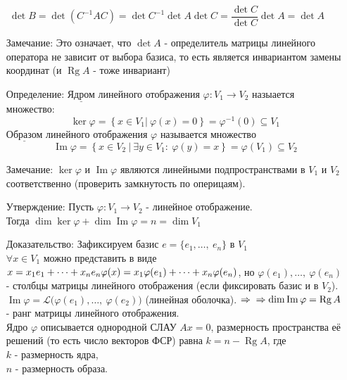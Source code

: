 \documentclass[12pt, letterpaper, twoside]{article}
\newcommand{\Underl}[1]{$\underline{\text{#1}}$}
\newcommand{\Rg}{\operatorname{Rg}}
\begin{document}
            \[\det B = \det \left(C^{-1} A C\right) = \det C^{-1}\det A\det C = \frac{\det C}{\det C}\det A = \det A\]
        \begin{enumerate}
            \item[Замечание:] Это означает, что $\det A$ - определитель матрицы линейного оператора не зависит от выбора базиса, то есть является инвариантом замены координат (и $\Rg A$ - тоже инвариант)
            \item[Определение:] \Underl{Ядром} линейного отображения $\varphi: V_1\longrightarrow V_2$ назыается множество:
            \[\ker \varphi = \left\{x\in V_1 \big|\ \varphi(x) = 0\right\} = \varphi^{-1}(0)\subseteq V_1\]
            \Underl{Образом} линейного отображения $\varphi$ называется множество
            \[\operatorname{Im} \varphi = \left\{ x \in V_2\ \big|\ \exists y\in V_1:\ \varphi(y) = x \right\} = \varphi(V_1)\subseteq V_2\]
            \item[Замечание:] $\ker \varphi$ и $\operatorname{Im}\varphi$ являются линейными подпространствами в $V_1$ и $V_2$ соответственно (проверить замкнутость по оперицаям).
            \item[Утверждение:] Пусть $\varphi: V_1\longrightarrow V_2$ - линейное отображение.\\
            Тогда $\dim \ker \varphi + \dim \operatorname{Im}\varphi = n = \dim V_1$  
            \item[Доказательство:] Зафиксируем базис $e = \{e_1,\dots,\ e_n\}$ в $V_1$\\
            $\forall x\in V_1$ можно представить в виде $x = x_1 e_1 + \dots + x_n e_n\\
            \varphi(x) = x_1 \varphi(e_1) + \dots + x_n \varphi(e_n)$, но $\varphi(e_1),\dots,\ \varphi(e_n)$ - столбцы матрицы линейного отображения (если фиксировать базис и в $V_2$).\\
            $\operatorname{Im} \varphi = \mathcal{L}\big(\varphi(e_1),\dots,\ \varphi(e_2)\big)$ (линейная оболочка). $\Rightarrow\\
            \Rightarrow \dim \operatorname{Im}\varphi = \Rg A$ - ранг матрицы линейного отображения.\\
            Ядро $\varphi$ описывается однородной СЛАУ $Ax = 0$, размерность пространства её решений (то есть число векторов ФСР) равна $k = n - \Rg A$, где\\
            $k$ - размерность ядра,\\
            $n$ - размерность образа.\\

\end{enumerate}
\end{document}
